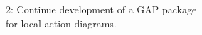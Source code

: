 \documentclass[preview]{standalone}
\begin{document}
\begin{center}
2: Continue development of a GAP package \\ \phantom{2: }for local action diagrams.
\end{center}
\end{document}
